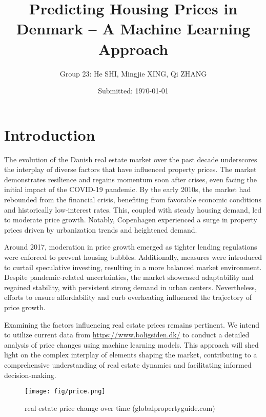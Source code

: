\documentclass[12pt]{article} %
\title{Predicting Housing Prices in Denmark -- A Machine Learning Approach}
\author{Group 23: He SHI, Mingjie XING, Qi ZHANG}
\date{Submitted: \today} %
\begin{document}
\maketitle

\newpage

\tableofcontents
\newpage

{\selectfont



\section{Introduction}
        The evolution of the Danish real estate market over the past decade underscores the interplay of diverse factors that have influenced property prices. The market demonstrates resilience and regains momentum soon after crises, even facing the initial impact of the COVID-19 pandemic. By the early 2010s, the market had rebounded from the financial crisis, benefiting from favorable economic conditions and historically low-interest rates. This, coupled with steady housing demand, led to moderate price growth. Notably, Copenhagen experienced a surge in property prices driven by urbanization trends and heightened demand.

        Around 2017, moderation in price growth emerged as tighter lending regulations were enforced to prevent housing bubbles. Additionally, measures were introduced to curtail speculative investing, resulting in a more balanced market environment. Despite pandemic-related uncertainties, the market showcased adaptability and regained stability, with persistent strong demand in urban centers. Nevertheless, efforts to ensure affordability and curb overheating influenced the trajectory of price growth.

        Examining the factors influencing real estate prices remains pertinent. We intend to utilize current data from \url{https://www.boligsiden.dk/} to conduct a detailed analysis of price changes using machine learning models. This approach will shed light on the complex interplay of elements shaping the market, contributing to a comprehensive understanding of real estate dynamics and facilitating informed decision-making.


        \begin{figure}[h]
            \centering
            \texttt{[image: fig/price.png]}
            \caption{real estate price change over time (globalpropertyguide.com)}
            \label{fig:price}
        \end{figure}

}
\end{document}
